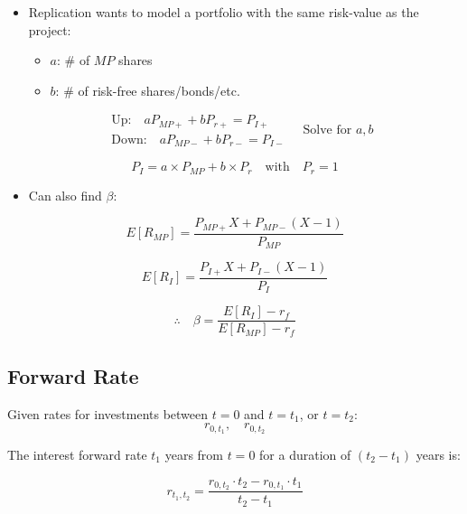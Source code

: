 \begin{definition}

    \begin{itemize}
        \item Replication wants to model a portfolio with the same risk-value as the project:
            \begin{itemize}
                \item $a$: \# of $MP$ shares
                \item $b$: \# of risk-free shares/bonds/etc.
            \end{itemize}
    \end{itemize}
    
    \begin{equation*}
        \begin{aligned}
            &\text{Up:} \quad a P_{MP+} + b P_{r+} = P_{I+} \\
            &\text{Down:} \quad a P_{MP-} + b P_{r-} = P_{I-}
        \end{aligned}
        \quad \text{Solve for } a, b
    \end{equation*}
    
    \[
    P_I = a \times P_{MP} + b \times P_r \quad \text{with} \quad P_r = 1
    \]
    
    \begin{itemize}
        \item Can also find $\beta$:
    \end{itemize}
    
    \[
    E[R_{MP}] = \frac{P_{MP+} X + P_{MP-} (X-1)}{P_{MP}}
    \]
    
    \[
    E[R_I] = \frac{P_{I+} X + P_{I-} (X-1)}{P_I}
    \]
    
    \[
    \therefore \quad \beta = \frac{E[R_I] - r_f}{E[R_{MP}] - r_f}
    \]

\end{definition}

\subsection{Forward Rate}
\begin{definition}
    Given rates for investments between $t=0$ and $t=t_1$, or $t=t_2$:
    \[
    r_{0,t_1}, \quad r_{0,t_2}
    \]

    \noindent The interest forward rate $t_1$ years from $t=0$ for a duration of $(t_2 - t_1)$ years is:
    
    \begin{equation}
        r_{t_1,t_2} = \frac{r_{0,t_2} \cdot t_2 - r_{0,t_1} \cdot t_1}{t_2 - t_1}
    \end{equation}            
\end{definition}